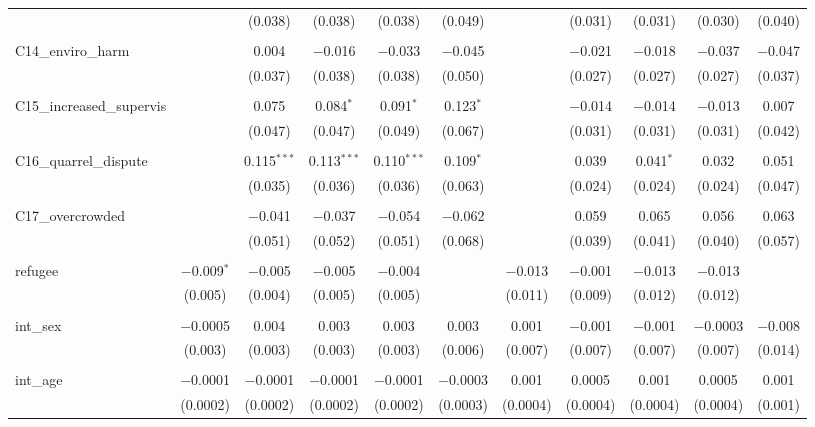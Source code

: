 \begin{table}[H]
\begin{tabular}{@{\extracolsep{4pt}}lcccccccccc}
  &  & (0.038) & (0.038) & (0.038) & (0.049) &  & (0.031) & (0.031) & (0.030) & (0.040) \\ 
  & & & & & & & & & & \\ 
 C14\_enviro\_harm &  & 0.004 & $-$0.016 & $-$0.033 & $-$0.045 &  & $-$0.021 & $-$0.018 & $-$0.037 & $-$0.047 \\ 
  &  & (0.037) & (0.038) & (0.038) & (0.050) &  & (0.027) & (0.027) & (0.027) & (0.037) \\ 
  & & & & & & & & & & \\ 
 C15\_increased\_supervis &  & 0.075 & 0.084$^{*}$ & 0.091$^{*}$ & 0.123$^{*}$ &  & $-$0.014 & $-$0.014 & $-$0.013 & 0.007 \\ 
  &  & (0.047) & (0.047) & (0.049) & (0.067) &  & (0.031) & (0.031) & (0.031) & (0.042) \\ 
  & & & & & & & & & & \\ 
 C16\_quarrel\_dispute &  & 0.115$^{***}$ & 0.113$^{***}$ & 0.110$^{***}$ & 0.109$^{*}$ &  & 0.039 & 0.041$^{*}$ & 0.032 & 0.051 \\ 
  &  & (0.035) & (0.036) & (0.036) & (0.063) &  & (0.024) & (0.024) & (0.024) & (0.047) \\ 
  & & & & & & & & & & \\ 
 C17\_overcrowded &  & $-$0.041 & $-$0.037 & $-$0.054 & $-$0.062 &  & 0.059 & 0.065 & 0.056 & 0.063 \\ 
  &  & (0.051) & (0.052) & (0.051) & (0.068) &  & (0.039) & (0.041) & (0.040) & (0.057) \\ 
  & & & & & & & & & & \\ 
 refugee & $-$0.009$^{*}$ & $-$0.005 & $-$0.005 & $-$0.004 &  & $-$0.013 & $-$0.001 & $-$0.013 & $-$0.013 &  \\ 
  & (0.005) & (0.004) & (0.005) & (0.005) &  & (0.011) & (0.009) & (0.012) & (0.012) &  \\ 
  & & & & & & & & & & \\ 
 int\_sex & $-$0.0005 & 0.004 & 0.003 & 0.003 & 0.003 & 0.001 & $-$0.001 & $-$0.001 & $-$0.0003 & $-$0.008 \\ 
  & (0.003) & (0.003) & (0.003) & (0.003) & (0.006) & (0.007) & (0.007) & (0.007) & (0.007) & (0.014) \\ 
  & & & & & & & & & & \\ 
 int\_age & $-$0.0001 & $-$0.0001 & $-$0.0001 & $-$0.0001 & $-$0.0003 & 0.001 & 0.0005 & 0.001 & 0.0005 & 0.001 \\ 
  & (0.0002) & (0.0002) & (0.0002) & (0.0002) & (0.0003) & (0.0004) & (0.0004) & (0.0004) & (0.0004) & (0.001) \\ 

\end{tabular}
\end{table}
